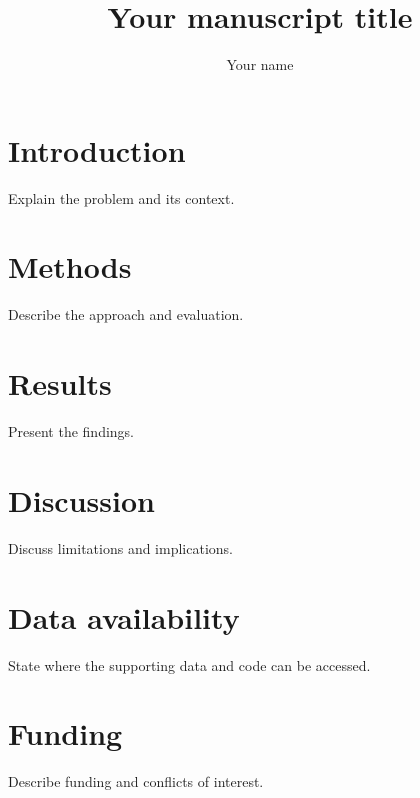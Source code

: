\documentclass[unnumsec,webpdf,contemporary,large,namedate]{oup-authoring-template}
\begin{document}
\title[Short title]{Your manuscript title}
\author[1]{Your name}
\address[1]{, , }
\maketitle
\section{Introduction}
Explain the problem and its context.
\section{Methods}
Describe the approach and evaluation.
\section{Results}
Present the findings.
\section{Discussion}
Discuss limitations and implications.
\section{Data availability}
State where the supporting data and code can be accessed.
\section{Funding}
Describe funding and conflicts of interest.
% 
% 
\end{document}
